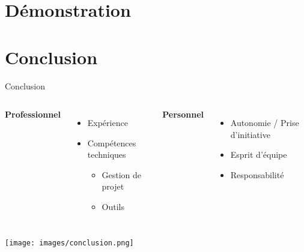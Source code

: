 \section{Démonstration}

\section{Conclusion}
\begin{frame}{Conclusion}
    

\begin{columns}[t]
    \textbf{Professionnel}
    \begin{itemize}
        \item Expérience
        \item Compétences techniques
        \begin{itemize}
            \item Gestion de projet
            \item Outils
        \end{itemize}
    \end{itemize}

    \textbf{Personnel}
    \begin{itemize}
        \item Autonomie / Prise d'initiative
        \item Esprit d'équipe
        \item Responsabilité
    \end{itemize}
\end{columns}
\begin{center}
    \texttt{[image: images/conclusion.png]}
\end{center}
\end{frame}



